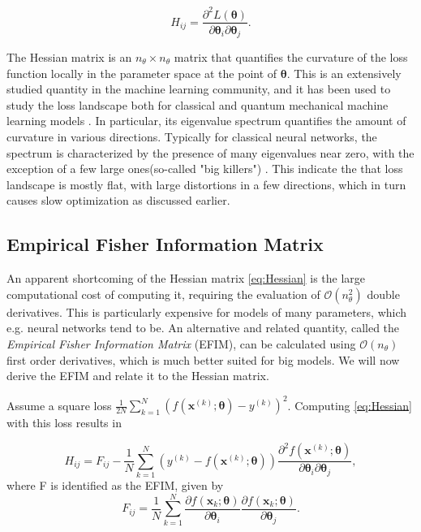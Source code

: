 \begin{equation}
\label{eq:Hessian}
    H_{ij} = \frac{\partial^2 L(\boldsymbol{\theta})}{\partial \boldsymbol{\theta}_i\partial \boldsymbol{\theta}_j}.
\end{equation}

The Hessian matrix is an $n_\theta \times n_\theta$ matrix that quantifies the curvature of the loss function locally in the parameter space at the point of $\boldsymbol{\theta}$. This is an extensively studied quantity in the machine learning community, and it has been used to study the loss landscape both for classical and quantum mechanical machine learning models \cite{LeCun2012, Huembeli_2021}. In particular, its eigenvalue spectrum quantifies the amount of curvature in various directions. Typically for classical neural networks, the spectrum is characterized by the presence of many eigenvalues near zero, with the exception of a few large ones(so-called "big killers") \cite{LeCun2012}. This indicate the that loss landscape is mostly flat, with large distortions in a few directions, which in turn causes slow optimization as discussed earlier. 

\subsection{Empirical Fisher Information Matrix}\label{sec:EFIM}
An apparent shortcoming of the Hessian matrix \autoref{eq:Hessian} is the large computational cost of computing it, requiring the evaluation of $\mathcal{O}(n_\theta^2)$ double derivatives. This is particularly expensive for models of many parameters, which e.g. neural networks tend to be. An alternative and related quantity, called the \emph{Empirical Fisher Information Matrix} (EFIM)\cite{karakida2019universal}, can be calculated using $\mathcal{O}(n_\theta)$ first order derivatives, which is much better suited for big models. We will now derive the EFIM and relate it to the Hessian matrix.

Assume a square loss $\frac{1}{2N}\sum_{k=1}^{N} (f(\boldsymbol{x}^{(k)}; \boldsymbol{\theta}) - y^{(k)})^2$. Computing \autoref{eq:Hessian} with this loss results in 
    
\begin{equation}\label{eq:HessianSquareLoss}
    H_{ij} = F_{ij} -
    \frac{1}{N}\sum_{k=1}^{N} (y^{(k)} - f(\boldsymbol{x}^{(k)};\boldsymbol{\theta}))\frac{\partial^2 f(\boldsymbol{x}^{(k)};\boldsymbol{\theta})}{\partial \boldsymbol{\theta}_i\partial \boldsymbol{\theta}_j}, 
\end{equation}
where F is identified as the EFIM, given by
\begin{equation}
\label{eq:EmpiricalFisher}
    F_{ij} =  \frac{1}{N}\sum_{k=1}^{N}
    \frac{\partial f(\boldsymbol{x}_k;\boldsymbol{\theta})}{\partial \boldsymbol{\theta}_i}
    \frac{\partial f(\boldsymbol{x}_k;\boldsymbol{\theta})}{\partial \boldsymbol{\theta}_j}.
\end{equation}

